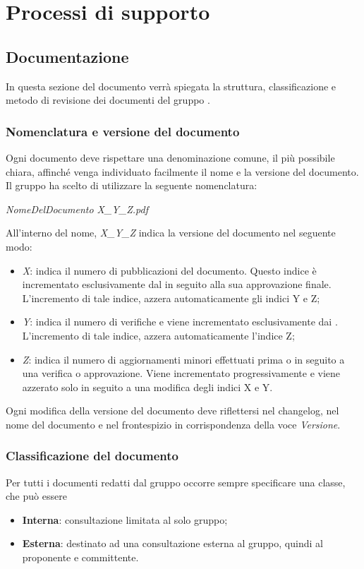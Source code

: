 \newpage

\section{Processi di supporto}

	\subsection{Documentazione}
	In questa sezione del documento verrà spiegata la struttura, classificazione e metodo di revisione dei documenti del gruppo \textit{\gruppo}.
	
		\subsubsection{Nomenclatura e versione del documento}
		Ogni documento deve rispettare una denominazione comune, il più possibile chiara, affinché venga individuato facilmente il nome e la versione del documento. Il gruppo ha scelto di utilizzare la seguente nomenclatura:
		\begin{center}
			\textit{NomeDelDocumento X\_Y\_Z.pdf}
		\end{center}
		All'interno del nome, \textit{X\_Y\_Z} indica la versione del documento nel seguente modo:
		\begin{itemize}
			\item \textit{X}: indica il numero di pubblicazioni del documento. Questo indice è incrementato esclusivamente dal \textit{\RdP} in seguito alla sua approvazione finale. L’incremento di tale indice, azzera automaticamente gli indici Y e Z;
			\item \textit{Y}: indica il numero di verifiche e viene incrementato esclusivamente dai \textit{\Vers}. L'incremento di tale indice, azzera automaticamente l'indice Z;
			\item \textit{Z}: indica il numero di aggiornamenti minori effettuati prima o in seguito a una verifica o approvazione. Viene incrementato progressivamente e viene azzerato solo in seguito a una modifica degli indici X e Y.
		\end{itemize}
		Ogni modifica della versione del documento deve riflettersi nel changelog, nel nome del documento e nel frontespizio in corrispondenza della voce \textit{Versione}.
	
		\subsubsection{Classificazione del documento}
		Per tutti i documenti redatti dal gruppo occorre sempre specificare una classe, che può essere
		\begin{itemize}
		\item\textbf{Interna}: consultazione limitata al solo gruppo;
		\item \textbf{Esterna}: destinato ad una consultazione esterna al gruppo, quindi al proponente e committente.
		\end{itemize} 
	
